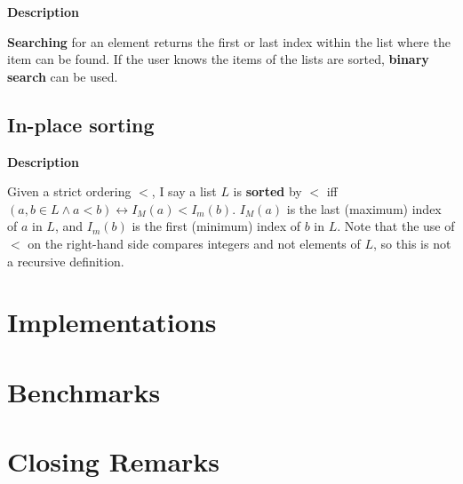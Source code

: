 \documentclass{article}
\newcommand{\descriptn}{\textbf{Description}}
\newcommand{\listname}{L}
\begin{document}
	\descriptn
	
	\textbf{Searching} for an element returns the first or last index within the list where the item can be found. If the user knows the items of the lists are sorted, \textbf{binary search} can be used.
	
	\subsection{In-place sorting}
	
	\descriptn
	
	Given a strict ordering $<$, I say a list $\listname$ is \textbf{sorted} by $<$ iff $\left(a, b \in \listname \land a < b\right) \leftrightarrow I_M(a) < I_m(b)$. $I_M(a)$ is the last (maximum) index of $a$ in $L$, and $I_m(b)$ is the first (minimum) index of $b$ in $L$. Note that the use of $<$ on the right-hand side compares integers and not elements of $L$, so this is not a recursive definition.
	
	\section{Implementations}
	
	\section{Benchmarks}
	
	\section{Closing Remarks}
\end{document}
